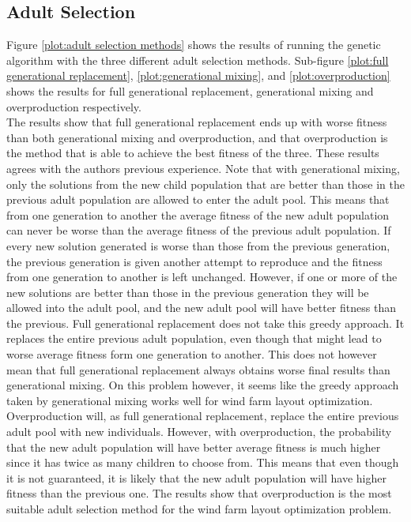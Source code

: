 \subsection{Adult Selection}
Figure \ref{plot:adult selection methods} shows the results of running the genetic algorithm with the three different adult selection methods. Sub-figure \ref{plot:full generational replacement}, \ref{plot:generational mixing}, and \ref{plot:overproduction} shows the results for full generational replacement, generational mixing and overproduction respectively. \\

\noindent The results show that full generational replacement ends up with worse fitness than both generational mixing and overproduction, and that overproduction is the method that is able to achieve the best fitness of the three. These results agrees with the authors previous experience. Note that with generational mixing, only the solutions from the new child population that are better than those in the previous adult population are allowed to enter the adult pool. This means that from one generation to another the average fitness of the new adult population can never be worse than the average fitness of the previous adult population. If every new solution generated is worse than those from the previous generation, the previous generation is given another attempt to reproduce and the fitness from one generation to another is left unchanged. However, if one or more of the new solutions are better than those in the previous generation they will be allowed into the adult pool, and the new adult pool will have better fitness than the previous. Full generational replacement does not take this greedy approach. It replaces the entire previous adult population, even though that might lead to worse average fitness form one generation to another. This does not however mean that full generational replacement always obtains worse final results than generational mixing. On this problem however, it seems like the greedy approach taken by generational mixing works well for wind farm layout optimization. Overproduction will, as full generational replacement, replace the entire previous adult pool with new individuals. However, with overproduction, the probability that the new adult population will have better average fitness is much higher since it has twice as many children to choose from. This means that even though it is not guaranteed, it is likely that the new adult population will have higher fitness than the previous one. The results show that overproduction is the most suitable adult selection method for the wind farm layout optimization problem.\\

